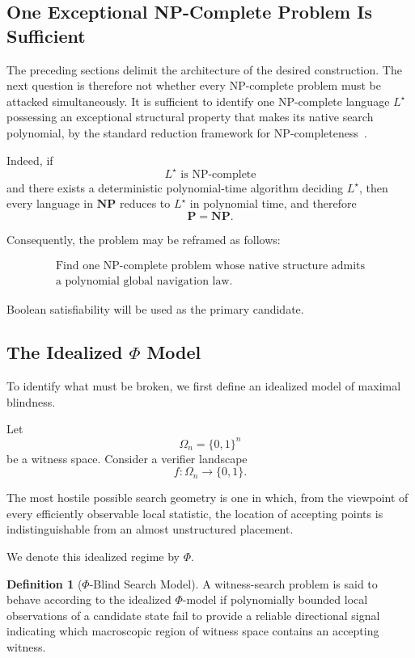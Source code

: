 \documentclass[11pt]{article}
\theoremstyle{plain}
\theoremstyle{definition}
\newtheorem{definition}[theorem]{Definition}
\begin{document}
\subsection{One Exceptional NP-Complete Problem Is Sufficient}

The preceding sections delimit the architecture of the desired construction.
The next question is therefore not whether every NP-complete problem must be
attacked simultaneously.  It is sufficient to identify one NP-complete
language \(L^\star\) possessing an exceptional structural property that makes
its native search polynomial, by the standard reduction framework for NP-completeness~\cite{Cook1971,Karp1972}.

Indeed, if
\[
    L^\star \text{ is NP-complete}
\]
and there exists a deterministic polynomial-time algorithm deciding
\(L^\star\), then every language in \(\mathbf{NP}\) reduces to \(L^\star\) in
polynomial time, and therefore
\[
    \mathbf{P}=\mathbf{NP}.
\]

Consequently, the problem may be reframed as follows:

\[
\boxed{\begin{gathered}
\text{Find one NP-complete problem whose native structure admits}\\
\text{a polynomial global navigation law.}
\end{gathered}}
\]

Boolean satisfiability will be used as the primary candidate.

\subsection{The Idealized \(\Phi\) Model}

To identify what must be broken, we first define an idealized model of
maximal blindness.

Let
\[
    \Omega_n=\{0,1\}^n
\]
be a witness space.  Consider a verifier landscape
\[
    f:\Omega_n\to\{0,1\}.
\]

The most hostile possible search geometry is one in which, from the viewpoint
of every efficiently observable local statistic, the location of accepting
points is indistinguishable from an almost unstructured placement.

We denote this idealized regime by \(\Phi\).

\begin{definition}[\(\Phi\)-Blind Search Model]
\label{def:phi-blind-model}
A witness-search problem is said to behave according to the idealized
\(\Phi\)-model if polynomially bounded local observations of a candidate
state fail to provide a reliable directional signal indicating which
macroscopic region of witness space contains an accepting witness.
\end{definition}
\end{document}
